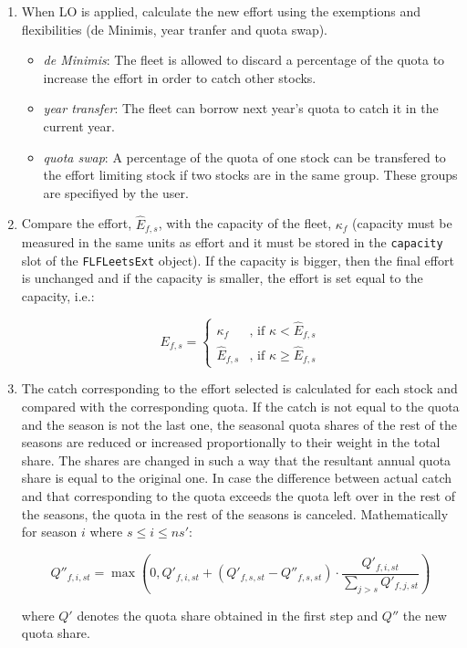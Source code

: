 \begin{enumerate}
	\item When LO is applied, calculate the new effort using the exemptions and flexibilities (de Minimis, 
	  year tranfer and quota swap). 
	  \begin{itemize}
  		\item \textit{de Minimis}: The fleet is allowed to discard a percentage of the quota to increase the effort 
  		  in order to catch other stocks.
  		\item \textit{year transfer}: The fleet can borrow next year's quota to catch it in the current year.
  		\item \textit{quota swap}: A percentage of the quota of one stock can be transfered to the effort 
  		  limiting stock if two stocks are in the same group. These groups are specifiyed by the user.
	  \end{itemize}		
		
  \item Compare the effort, $\hat{E}_{f,s}$, with the capacity of the fleet, $\kappa_f$  
    (capacity must be measured in the same units as effort and it must be stored in the \texttt{capacity} slot 
    of the \texttt{FLFLeetsExt} object). 
		If the capacity is bigger, then the final effort is unchanged and if the capacity is smaller, 
		the effort is set equal to the capacity, i.e.:
	
	\begin{equation}	
			E_{f,s} =
  				\begin{cases}
  				 	\kappa_f			 & \text{, if } \kappa < \hat{E}_{f,s}\\
   					\hat{E}_{f,s}  & \text{, if } \kappa \geq \hat{E}_{f,s}
  				\end{cases}
	\end{equation}	 
	
	\item The catch corresponding to the effort selected is calculated for each stock and compared with the 
	  corresponding quota. 
		If the catch is not equal to the quota and the season is not the last one, 
		the seasonal quota shares of the rest of the seasons are reduced or increased 
		proportionally to their weight in the total share. The shares are changed 
		in such a way that the resultant annual quota share is equal to the original one.
		In case the difference between actual catch and that corresponding to the quota exceeds
		the quota left over in the rest of the seasons, the quota in the rest of the seasons is
		canceled.	Mathematically for season $i$ where $s \leq i \leq ns'$: 
		
	\begin{equation}
		Q''_{f,i,st} =  \max\left( 0,Q'_{f,i,st} + (Q'_{f,s,st} - Q''_{f,s,st}) \cdot 
		                \frac{Q'_{f,i,st}}{\sum_{j>s} Q'_{f,j,st}}\right) 
	\end{equation}
		
		\noindent where $Q'$ denotes the quota share obtained in the first step and $Q''$ the new quota share. 
	
\end{enumerate}

